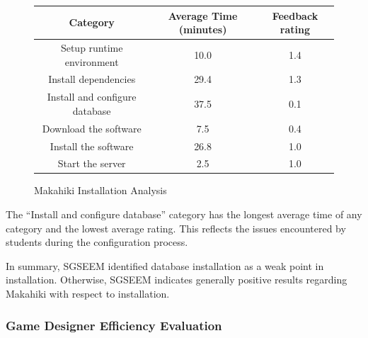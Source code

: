 \documentclass{sigchi}
\newcommand\tabhead[1]{\small\textbf{#1}}
\begin{document}
\begin{figure}[ht!]
  \centering
  \begin{tabular}{|c|c|c|}
    \hline
    \multicolumn{1}{|p{0.5\columnwidth}|}{\centering\tabhead{Category}} &
    \multicolumn{1}{|p{0.2\columnwidth}|}{\centering\tabhead{Average Time (minutes)}} &
    \multicolumn{1}{|p{0.15\columnwidth}|}{\centering\tabhead{Feedback rating}} \\
    \hline
    \multicolumn{1}{|p{0.5\columnwidth}|}{Setup runtime environment} &
    \multicolumn{1}{|p{0.2\columnwidth}|}{10.0} &
    \multicolumn{1}{|p{0.15\columnwidth}|}{1.4} \\
    \hline
    \multicolumn{1}{|p{0.5\columnwidth}|}{Install dependencies} &
    \multicolumn{1}{|p{0.2\columnwidth}|}{29.4} &
    \multicolumn{1}{|p{0.15\columnwidth}|}{1.3} \\
    \hline
    \multicolumn{1}{|p{0.5\columnwidth}|}{Install and configure database} &
    \multicolumn{1}{|p{0.2\columnwidth}|}{37.5} &
    \multicolumn{1}{|p{0.15\columnwidth}|}{0.1} \\
    \hline
    \multicolumn{1}{|p{0.5\columnwidth}|}{Download the software} &
    \multicolumn{1}{|p{0.2\columnwidth}|}{7.5} &
    \multicolumn{1}{|p{0.15\columnwidth}|}{0.4} \\
    \hline
    \multicolumn{1}{|p{0.5\columnwidth}|}{Install the software} &
    \multicolumn{1}{|p{0.2\columnwidth}|}{26.8} &
    \multicolumn{1}{|p{0.15\columnwidth}|}{1.0} \\
    \hline
    \multicolumn{1}{|p{0.5\columnwidth}|}{Start the server} &
    \multicolumn{1}{|p{0.2\columnwidth}|}{2.5} &
    \multicolumn{1}{|p{0.15\columnwidth}|}{1.0} \\
    \hline
  \end{tabular}
  \caption{Makahiki Installation Analysis}
  \label{fig:makahiki-install}
\end{figure}

The ``Install and configure database'' category has the longest average time of any category
and the lowest average rating. This reflects the issues encountered by students during the
configuration process.

In summary, SGSEEM identified database installation as a weak point in
installation.  Otherwise, SGSEEM indicates generally positive results regarding
Makahiki with respect to installation. 

\subsubsection{Game Designer Efficiency Evaluation}
\end{document}
